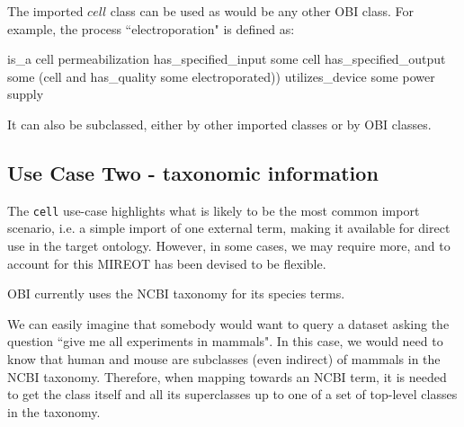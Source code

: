 \documentclass[a4paper,10pt,twocolumn]{article}
\begin{document}


The imported $cell$ class can be used as would be any other OBI class. For example, the process ``electroporation" is defined as:

\begin{footnotesize}
\begin{verbatimtab}
is_a cell permeabilization
has_specified_input some cell
has_specified_output some 
   (cell and has_quality some electroporated))
utilizes_device some power supply
\end{verbatimtab}
\end{footnotesize}

It can also be subclassed, either by other imported classes or by OBI classes.


\subsection*{Use Case Two - taxonomic information}

The \texttt{cell} use-case highlights what is likely to be the most common import scenario, i.e. a simple import of one external term, making it available for direct use in the target ontology.
However, in some cases, we may require more, and to account for this \ac{MIREOT} has been devised to be flexible.


OBI currently uses the NCBI taxonomy for its species terms.



We can easily imagine that somebody would want to query a dataset asking the question ``give me all experiments in mammals".
In this case, we would need to know that human and mouse are subclasses (even indirect) of mammals in the NCBI taxonomy.
Therefore, when mapping towards an NCBI term, it is needed to get the class itself and all its superclasses up to one of a set of top-level classes in the taxonomy.
\end{document}
